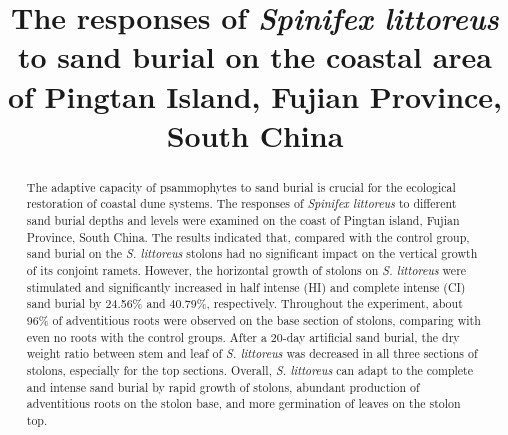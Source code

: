 \documentclass[]{interact}
\theoremstyle{plain}%
\theoremstyle{definition}
\theoremstyle{remark}
\begin{document}

\title{The responses of \textit{\textit{Spinifex littoreus}} to sand burial on the coastal area of Pingtan Island, Fujian Province, South China}

\author{
}

\maketitle

\begin{abstract}
\label{abstract}
The adaptive capacity of psammophytes to sand burial is crucial for the ecological restoration of coastal dune systems. 
The responses of \textit{Spinifex littoreus} to different sand burial depths and levels were examined on the coast of Pingtan island, Fujian Province, South China. 
The results indicated that, compared with the control group, sand burial on the \textit{S. littoreus} stolons had no significant impact on the vertical growth of its conjoint ramets. 
However, the horizontal growth of stolons on \textit{S. littoreus} were stimulated and significantly increased in half intense (HI) and complete intense (CI) sand burial by 24.56\% and 40.79\%, respectively. 
Throughout the experiment, about 96\% of adventitious roots were observed on the base section of stolons, comparing with even no roots with the control groups. 
After a 20-day artificial sand burial, the dry weight ratio between stem and leaf of \textit{S. littoreus} was decreased in all three sections of stolons, especially for the top sections. 
Overall, \textit{S. littoreus} can adapt to the complete and intense sand burial by rapid growth of stolons, abundant production of adventitious roots on the stolon base, and more germination of leaves on the stolon top.
\end{abstract}
\end{document}
